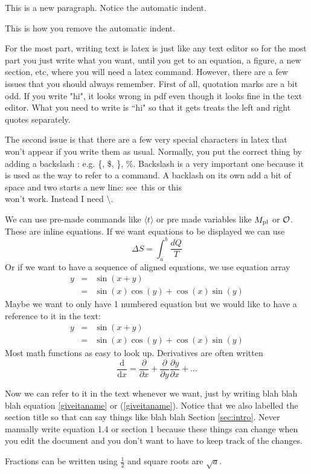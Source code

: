 \documentclass[11pt]{article}
\numberwithin{equation}{section}
\def\beq{\begin{equation}}
\def\eeq{\end{equation}}
\def\bea{\begin{eqnarray}}
\def\eea{\end{eqnarray}}
\def\cO{{\cal O}}
\def\Mp{M_{\rm pl}}
\newcommand{\vev}[1]{\langle #1 \rangle}
\begin{document}
This is a new paragraph.  Notice the automatic indent.

\noindent This is how you remove the automatic indent.

For the most part, writing text is latex is just like any text editor so for the most part you just write what you want, until you get to an equation, a figure, a new section, etc, where you will need a latex command.  However, there are a few issues that you should always remember.  First of all, quotation marks are a bit odd.  If you write "hi", it looks wrong in pdf even though it looks fine in the text editor.  What you need to write is ``hi" so that it gets treats the left and right quotes separately.

The second issue is that there are a few very special characters in latex that won't appear if you write them as usual.  Normally, you put the correct thing by adding a backslash : e.g. \{, \$, \}, \%.  Backslash is a very important one because it is used as the way to refer to a command.  A backlash on its own add a bit of space and two starts a new line: see\ this or this\\ won't work.  Instead I need \textbackslash.

We can use  pre-made commands like $\vev{t}$ or pre made variables like $\Mp$ or $\cO$.  These are inline equations.  If we want equations to be displayed we can use
\beq
\Delta S = \int_a^b \frac{d Q}{T}
\eeq
Or if we want to have a sequence of aligned equations, we use equation array
\bea
y&=&\sin(x+y) \\
&=& \sin(x) \cos(y)+ \cos(x) \sin(y)
\eea
Maybe we want to only have 1 numbered equation but we would like to have a reference to it in the text:\
\bea
y&=&\sin(x+y) \nonumber \\
&=& \sin(x) \cos(y)+ \cos(x) \sin(y) \label{giveitaname}
\eea
Most math functions as easy to look up.  Derivatives are often written
\beq
\frac{\mathrm d}{\mathrm d x} = \frac{\partial}{\partial x} + \frac{\partial}{\partial y} \frac{\partial y}{\partial x} + \ldots
\eeq

Now we can refer to it in the text whenever we want, just by writing blah blah blah equation \ref{giveitaname} or (\ref{giveitaname}).  Notice that we also labelled the section title so that can say things like blah blah Section \ref{sec:intro}.  Never manually write equation 1.4 or section 1 because these things can change when you edit the document and you don't want to have to keep track of the changes.

Fractions can be written using $\frac{1}{2}$ and square roots are $\sqrt{a}$.
\end{document}
